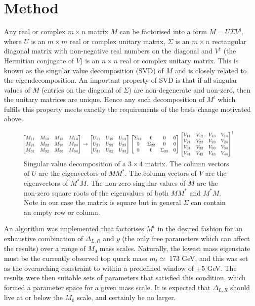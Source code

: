 \documentclass[a4paper]{jpconf}
\begin{document}
\section{Method}
Any real or complex \(m \times n\) matrix \(M\) can be factorised into a form \(M = U\Sigma V^\dag\), where \(U\) is an \(m \times m\) real or complex unitary matrix, \(\Sigma\) is an \(m \times n\) rectangular diagonal matrix with non-negative real numbers on the diagonal and \(V^\dag\) (the Hermitian conjugate of \(V\)) is an \(n \times n\) real or complex unitary matrix. This is known as the singular value decomposition (SVD) of \(M\) and is closely related to the eigendecomposition. An important property of SVD is that if all singular values of \(M\) (entries on the diagonal of \(\Sigma\)) are non-degenerate and non-zero, then the unitary matrices are unique. Hence any such decomposition of \(M^{t}\) which fulfils this property meets exactly the requirements of the basis change motivated above. \\

\begin{figure}[h]
	\centering
	\includegraphics[scale=0.25]{svd1}
	\caption{Singular value decomposition of a \(3\times4\) matrix. The column vectors of \(U\) are the eigenvectors of \(MM^*\). The column vectors of \(V\) are the eigenvectors of \(M^*M\). The non-zero singular values of \(M\) are the non-zero square roots of the eigenvalues of both \(MM^*\) and \(M^*M\). Note in our case the matrix is square but in general \(\Sigma\) can contain an empty row or column. }
	\label{fig:svd}
\end{figure}

\noindent An algorithm was implemented that factorises \(M^{t}\) in the desired fashion for an exhaustive combination of \(\Delta_{L,R}\) and \(y\) (the only free parameters which can affect the results) over a range of \(M_0\) mass scales. Naturally, the lowest mass eigenstate must be the currently observed top quark mass \(m_{t} \simeq\) 173 GeV, and this was set as the overarching constraint to within a predefined window of \(\pm\)5 GeV. The results were then suitable sets of parameters that satisfied this condition, which formed a parameter space for a given mass scale. It is expected that \(\Delta_{L,R}\) should live at or below the \(M_0\) scale, and certainly be no larger. 
\end{document}
